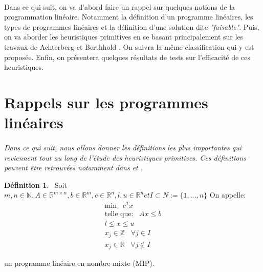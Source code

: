 \documentclass[12pt,a4paper,oneside]{book}
\theoremstyle{definition}
\newtheorem{definition}{Définition}[section]
\newcommand{\R}{\mathbb{R}}
\newcommand{\N}{\mathbb{N}}
\begin{document}
	\paragraph{}
	Dans ce qui suit, on va d’abord faire un rappel sur quelques notions de la programmation linéaire. Notamment la définition d’un programme linéaires, les types de programmes linéaires et la définition d'une solution dite \textit{"faisable"}. Puis, on va aborder les heuristiques primitives en se basant principalement sur les travaux de Achterberg et Berthhold \cite{berthold2006}. On suivra la même classification qui y est proposée. Enfin, on présentera quelques résultats de tests sur l'efficacité de ces heuristiques.
	
	\section{Rappels sur les programmes linéaires}
	\paragraph{}
	\textit{Dans ce qui suit, nous allons donner les définitions les plus importantes qui reviennent tout au long de l’étude des heuristiques primitives. Ces définitions peuvent être retrouvées notamment dans \cite{berthold2006} et \cite{Hendel2011}. %
	}
	
	\begin{definition} \label{def:defmip} \ 
		Soit $m,n \in \N, A \in \R^{m \times n}, b \in \R^m, c \in \R^n, l,u \in \R^n et I \subset N := \{1,...,n\} $
		On appelle:\\
		
		\[
		\begin{aligned}
		\text{min} \hspace{10pt}  c^T x \\
		\text{telle que:} \hspace{10pt} Ax \leq b \\ 
		l \leq x \leq u \\
		x_j \in \mathbb{Z} \hspace{10pt} \forall j \in I \\
		x_j \in \R \hspace{10pt} \forall j \notin I 
		\end{aligned}
		\]
		
		
		un programme linéaire en nombre mixte (MIP).
	\end{definition}
	
\end{document}
